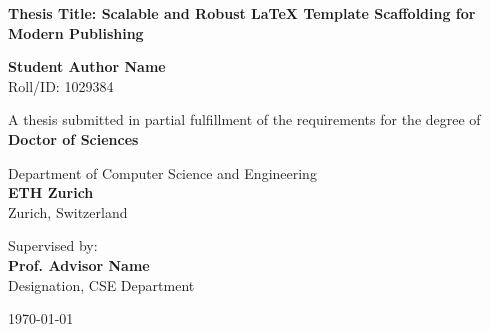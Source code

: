 \begin{titlepage}
\begin{center}
    \vspace*{1cm}
    
    
    \vspace{1.5cm}
    
    {\huge \bfseries \color{primary} Thesis Title: Scalable and Robust LaTeX Template Scaffolding for Modern Publishing}
    
    \vspace{1.5cm}
    
    {\Large \bfseries Student Author Name} \\
    \vspace{0.2cm}
    {Roll/ID: 1029384}
    
    \vspace{1.5cm}
    
    {A thesis submitted in partial fulfillment of the requirements for the degree of} \\
    \vspace{0.3cm}
    {\large \bfseries \color{secondary} Doctor of Sciences}
    
    \vspace{1.5cm}
    
    {\large Department of Computer Science and Engineering} \\
    \vspace{0.2cm}
    {\large \bfseries \color{primary} ETH Zurich} \\
    \vspace{0.1cm}
    {Zurich, Switzerland}
    
    \vfill
    
    {Supervised by:} \\
    {\large \bfseries Prof. Advisor Name} \\
    {Designation, CSE Department}
    
    \vspace{1cm}
    
    {\large \today}
    
\end{center}
\end{titlepage}
